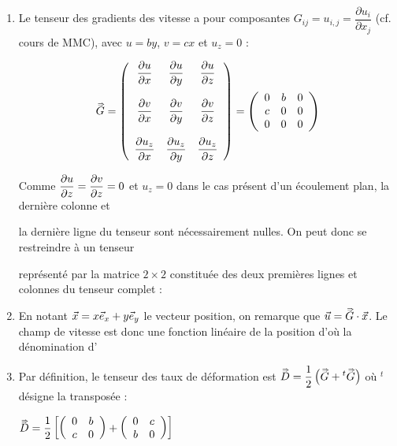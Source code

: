 \documentclass[10pt, a4paper]{article}
\renewcommand{\myvec}[1]{\vec{#1}}
\begin{document}
\begin{enumerate}
\item
Le tenseur des gradients des vitesse a pour composantes
$G_{ij} = u_{i, j} = \dfrac{\partial u_i}{\partial x_j}$ (cf. cours de MMC),
avec $u = by$, $v=cx$ et $u_z = 0$ :

\[
	\accentset{\Rightarrow}{G} =
	\left (
		\begin{array}{ccc}
			\displaystyle \frac{\partial u}{\partial x} & \displaystyle \frac{\partial u}{\partial y} & \displaystyle \frac{\partial u}{\partial z} \\ & & \\
			\displaystyle \frac{\partial v}{\partial x} & \displaystyle \frac{\partial v}{\partial y} & \displaystyle \frac{\partial v}{\partial z} \\ & & \\
			\displaystyle \frac{\partial u_z}{\partial x} & \displaystyle \frac{\partial u_z}{\partial y} & \displaystyle \frac{\partial u_z}{\partial z}
		\end{array}
	\right )
	=
	\left (
		\begin{array}{ccc}
			0 & b & 0 \\ 
			c & 0 & 0 \\
			0 & 0 & 0
		\end{array}
	\right )
\]

Comme $\displaystyle \frac{\partial u}{\partial z} = \displaystyle \frac{\partial v}{\partial z} = 0$ et $u_z = 0$ dans le cas présent d'un écoulement plan, la dernière colonne et 

\medskip
la dernière ligne du tenseur sont nécessairement nulles. 
On peut donc se restreindre à un tenseur 

\medskip
représenté par la matrice 
$2 \times 2$ constituée des deux premières lignes et colonnes du tenseur complet :

\medskip
\dotfill 
{}

\item
En notant $\myvec{x} = x\ex + y\ey$ le vecteur position, on remarque que
$\myvec{u} = \mytensor{G} \cdot \myvec{x}$.
Le champ de vitesse est donc une fonction linéaire de la position d'où la dénomination d'\,

\item
Par définition, le tenseur des taux de déformation est $\accentset{\Rightarrow}{D} 
= \displaystyle \frac{1}{2} \left ( \accentset{\Rightarrow}{G} + {}^t \accentset{\Rightarrow}{G} \right )$
où ${}^t$ désigne la transposée :

\medskip
$
	\accentset{\Rightarrow}{D} = \displaystyle \frac{1}{2} \left [
	 \left (
		\begin{array}{cc}
			0 & b \\ 
			c & 0 
		\end{array}
	\right )
+
\left (
		\begin{array}{cc}
			0 & c \\ 
			b & 0 
		\end{array}
	\right )
\right ]
$
\dotfill
{}


\end{enumerate}
\end{document}
